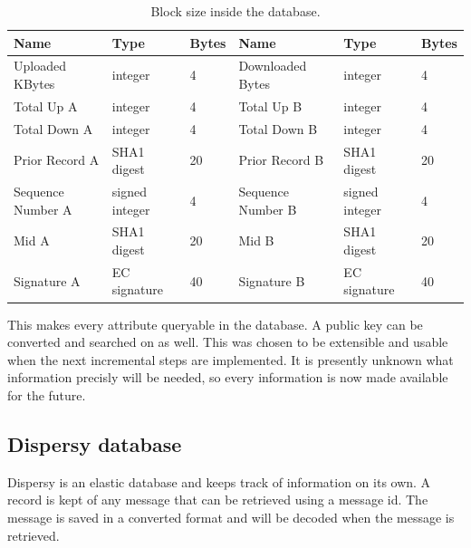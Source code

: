 \begin{table}[]
\begin{adjustwidth}{-.5in}{-.5in}
\begin{center}
\begin{tabular}{l|lll|ll}
Name              & Type             & Bytes                   & Name              & Type             & Bytes \\ \hline
Uploaded KBytes   & integer          & \multicolumn{1}{l|}{4}  & Downloaded Bytes  & integer          & 4     \\
Total Up A        & integer          & \multicolumn{1}{l|}{4}  & Total Up B        & integer          & 4     \\
Total Down A      & integer          & \multicolumn{1}{l|}{4}  & Total Down B      & integer          & 4     \\
Prior Record A    & SHA1 digest      & \multicolumn{1}{l|}{20} & Prior Record B    & SHA1 digest      & 20    \\
Sequence Number A & signed integer   & \multicolumn{1}{l|}{4}  & Sequence Number B & signed integer   & 4     \\
Mid A             & SHA1 digest      & \multicolumn{1}{l|}{20} & Mid B             & SHA1 digest      & 20    \\
Signature A       & EC signature     & \multicolumn{1}{l|}{40} & Signature B       & EC signature     & 40
\end{tabular}
\caption{Block size inside the database.}
\label{table:block_size_persistence}
\end{center}
\end{adjustwidth}
\end{table}

This makes every attribute queryable in the database.
A public key can be converted and searched on as well.
This was chosen to be extensible and usable when the next incremental steps are implemented.
It is presently unknown what information precisly will be needed,
so every information is now made available for the future.

\subsection{Dispersy database}
Dispersy is an elastic database and keeps track of information on its own.
A record is kept of any message that can be retrieved using a message id.
The message is saved in a converted format and will be decoded when the message is retrieved.


